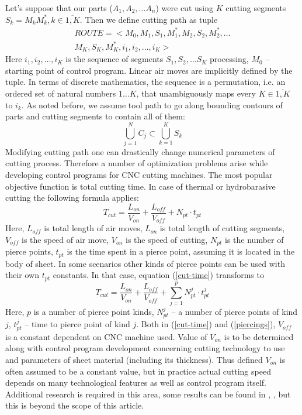 \documentclass{ifacconf}
\begin{document}
Let's suppose that our parts
($A_1, A_2, \dots A_n$) were cut
using $K$ cutting segments
$S_k = M_kM_k^*, k \in \overline{1, K}$.
Then we define cutting path as tuple
\begin{multline}
    ROUTE =
    \big< M_0, M_1, S_1, M_1^*, M_2, S_2, M_2^*, \dots \\
    M_K, S_K, M_K^*, i_1, i_2, \dots, i_K \big>
  \label{tuple}
\end{multline}
Here $i_1, i_2, \dots, i_K$ is the sequence of segments
$S_1, S_2, \dots S_K$ processing,
$M_0$ -- starting point of control program.
Linear air moves are implicitly defined by the tuple.
In terms of discrete mathematics,
the sequence is a permutation,
i.e. an ordered set of natural numbers $1\dots K$,
that unambiguously maps every
$K \in \overline{1, K}$ to $i_k$.
As noted before,
we assume tool path to go along
bounding contours of parts
and cutting segments to contain all of them:
$$
\bigcup_{j=1}^N C_j \subset \bigcup_{k=1}^K S_k
$$
Modifying cutting path one can
drastically change numerical parameters
of cutting process.
Therefore a number of optimization problems
arise while developing
control programs for CNC cutting machines.
The most popular objective function
is total cutting time.
In case of thermal or
hydrobarasive cutting the following formula applies:
\begin{equation}
    T_{cut} = \frac{L_{on}}{V_{on}} + \frac{L_{off}}{V_{off}} + N_{pt} \cdot t_{pt}
    \label{cut-time}
\end{equation}
Here,
$L_{off}$ is total length of air moves,
$L_{on}$ is total length of cutting segments,
$V_{off}$ is the speed of air move,
$V_{on}$ is the speed of cutting,
$N_{pt}$ is the number of pierce points,
$t_{pt}$ is the time spent in a pierce point,
assuming it is located in the body of sheet.
In some scenarios other kinds of pierce points
can be used
with their own $t_{pt}$ constants.
In that case, equation (\ref{cut-time})
transforms to
\begin{equation}
    T_{cut} = \frac{L_{on}}{V_{on}} + \frac{L_{off}}{V_{off}}
    + \sum_{j=1}^p N_{pt}^j \cdot t_{pt}^j
    \label{piercings}
\end{equation}
Here,
$p$ is a number of pierce point kinds,
$N_{pt}^j$ -- a number of pierce points of kind $j$,
$t_{pt}^j$ -- time to pierce point of kind $j$.
Both in (\ref{cut-time}) and (\ref{piercings}),
$V_{off}$ is a constant dependent on CNC machine used.
Value of $V_{on}$ is to be determined along with
control program development
concerning cutting technology to use
and parameters of sheet material
(including its thickness).
Thus defined $V_{on}$
is often assumed to be a constant value,
but in practice
actual cutting speed depends on
many technological features as well as
control program itself.
Additional research is required in this area,
some results can be found in
\cite{Tavaeva2017May},
\cite{tavaeva2015definition},
but this is beyond the scope of this article.
\end{document}
